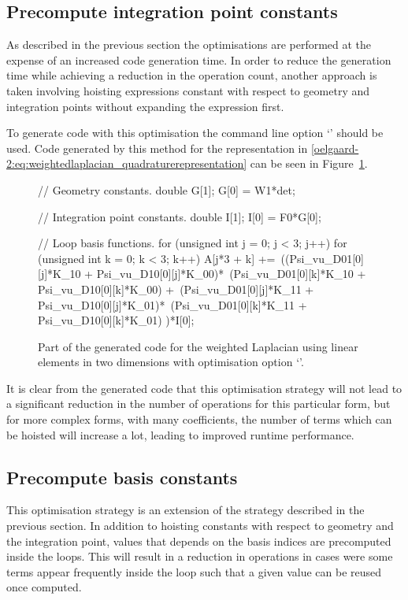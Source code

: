 \subsection{Precompute integration point constants}
%
As described in the previous section the optimisations are performed at the
expense of an increased code generation time.
In order to reduce the generation time while achieving a reduction in the
operation count, another approach is taken involving hoisting expressions
constant with respect to geometry and integration points without
expanding the expression first.

To generate code with this optimisation the \ffc{} command line option
`' should be used.
Code generated by this method for the representation in
\eqref{oelgaard-2:eq:weightedlaplacian_quadraturerepresentation} can be seen in
Figure~\ref{oelgaard-2:fig:O_ip_code}.
%
\begin{figure}
\begin{code}
// Geometry constants.
double G[1];
G[0] = W1*det;

// Integration point constants.
double I[1];
I[0] = F0*G[0];

// Loop basis functions.
for (unsigned int j = 0; j < 3; j++)
{
  for (unsigned int k = 0; k < 3; k++)
  {
    A[j*3 + k] +=\
    ((Psi_vu_D01[0][j]*K_10 + Psi_vu_D10[0][j]*K_00)*\
     (Psi_vu_D01[0][k]*K_10 + Psi_vu_D10[0][k]*K_00) +\
     (Psi_vu_D01[0][j]*K_11 + Psi_vu_D10[0][j]*K_01)*\
     (Psi_vu_D01[0][k]*K_11 + Psi_vu_D10[0][k]*K_01)
    )*I[0];
  }
}
\end{code}
\caption{Part of the generated code for the weighted Laplacian using linear
         elements in two dimensions with optimisation option
         `'.}
\label{oelgaard-2:fig:O_ip_code}
\end{figure}
%
It is clear from the generated code that this optimisation strategy will not
lead to a significant reduction in the number of operations for this particular
form, but for more complex forms, with many coefficients, the number of terms
which can be hoisted will increase a lot, leading to improved runtime
performance.
%
\subsection{Precompute basis constants}
%
This optimisation strategy is an extension of the strategy described in the
previous section.
In addition to hoisting constants with respect to geometry and the integration
point, values that depends on the basis indices are precomputed inside the
loops.
This will result in a reduction in operations in cases were some terms appear
frequently inside the loop such that a given value can be reused once computed.

